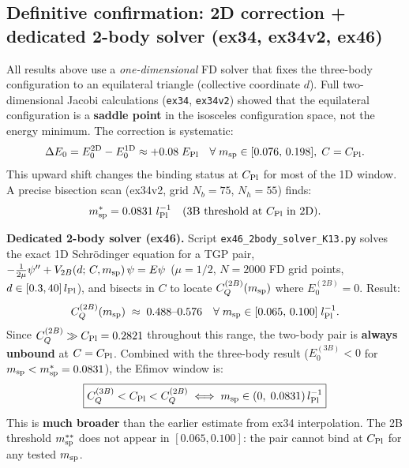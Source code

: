 \subsection{Definitive confirmation: 2D correction + dedicated 2-body solver (ex34, ex34v2, ex46)}
\label{ssec:qw_msp_2d}

\begin{remark}%
\label{rem:qw_msp_2d_revision}
All results above use a \emph{one-dimensional} FD solver that fixes the
three-body configuration to an equilateral triangle (collective coordinate
$d$).  Full two-dimensional Jacobi calculations (\texttt{ex34},
\texttt{ex34v2}) showed that the equilateral configuration is a
\textbf{saddle point} in the isosceles configuration space, not the
energy minimum.  The correction is systematic:
\begin{equation}
  \Delta E_0 = E_0^{\rm 2D} - E_0^{\rm 1D} \approx +0.08\;E_{\rm Pl}
  \quad\forall\; m_{\rm sp} \in [0.076,\,0.198],\; C = C_{\rm Pl}.
\end{equation}
This upward shift changes the binding status at $C_{\rm Pl}$ for most of the
1D window.  A precise bisection scan (ex34v2, grid $N_b=75$, $N_h=55$) finds:
\begin{equation}
  m_{\rm sp}^* = 0.0831\;l_{\rm Pl}^{-1}
  \quad\text{(3B threshold at $C_{\rm Pl}$ in 2D)}.
\end{equation}

\noindent\textbf{Dedicated 2-body solver (ex46).}
Script \texttt{ex46\_2body\_solver\_K13.py} solves the exact 1D
Schrödinger equation for a TGP pair,
$-\tfrac{1}{2\mu}\psi'' + V_{2B}(d;\,C,m_{\rm sp})\,\psi = E\psi$
($\mu = 1/2$, $N=2000$ FD grid points, $d\in[0.3,40]\,l_{\rm Pl}$),
and bisects in $C$ to locate $C_Q^{(2B)}(m_{\rm sp})$ where $E_0^{(2B)}=0$.
Result:
\begin{equation}\label{eq:CQ2B-ex46}
  C_Q^{(2B)}(m_{\rm sp}) \;\approx\; 0.488\text{--}0.576
  \quad \forall\; m_{\rm sp} \in [0.065,\,0.100]\;l_{\rm Pl}^{-1}.
\end{equation}
Since $C_Q^{(2B)} \gg C_{\rm Pl} = 0.2821$ throughout this range,
the two-body pair is \textbf{always unbound} at $C = C_{\rm Pl}$.
Combined with the three-body result ($E_0^{(3B)} < 0$ for
$m_{\rm sp} < m_{\rm sp}^* = 0.0831$), the Efimov window is:
\begin{equation}
  \boxed{C_Q^{(3B)} < C_{\rm Pl} < C_Q^{(2B)}
  \;\Longleftrightarrow\;
  m_{\rm sp} \in (0,\;0.0831)\,l_{\rm Pl}^{-1}}
\label{eq:msp_window_2d}
\end{equation}
This is \textbf{much broader} than the earlier estimate from ex34 interpolation.
The 2B threshold $m_{\rm sp}^{**}$ does not appear in $[0.065, 0.100]$:
the pair cannot bind at $C_{\rm Pl}$ for any tested $m_{\rm sp}$.


\end{remark}
